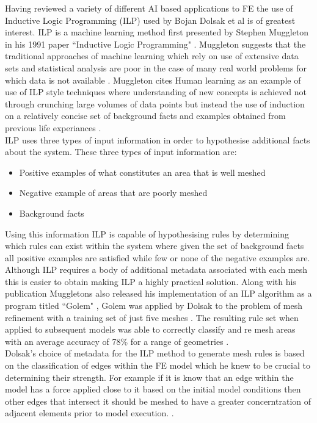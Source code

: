 \documentclass{article}
\begin{document}
\noindent
Having reviewed a variety of different AI based applications to FE the use of Inductive Logic Programming (ILP) used by Bojan Dolsak et al is of greatest interest. ILP is a machine learning method first presented by Stephen Muggleton in his 1991 paper ``Inductive Logic Programming" \cite{MuggletonILP}. Muggleton suggests that the traditional approaches of machine learning which rely on use of extensive data sets and statistical analysis are poor in the case of many real world problems for which data is not available \cite{ILPYoutubeLecture}. Muggleton cites Human learning as an example of use of ILP style techniques where understanding of new concepts is achieved not through crunching large volumes of data points but instead  the use of induction on a relatively concise set of background facts and examples obtained from previous life experiances \cite{ILPYoutubeLecture}. \\ 

\noindent
ILP uses three types of input information in order to hypothesise additional facts about the system. These three types of input information are: \\ 

\begin{itemize}
\item Positive examples  of what constitutes an area that is well meshed
\item Negative example of areas that are poorly meshed
\item Background facts
\end{itemize}

\noindent
Using this information ILP is capable of hypothesising rules by determining which rules can exist within the system where given the set of background facts all positive examples are satisfied while few or none of the negative examples are. Although ILP requires a body of additional metadata associated with each mesh this is easier to obtain making ILP a highly practical solution. Along with his publication Muggletons also released his implementation of an ILP algorithm as a program titled ``Golem" \cite{Golem}, Golem was applied by Dolsak to the problem of mesh refinement with a training set of just five meshes \cite{DolsakPaper94}. The resulting rule set when applied to subsequent models was able to correctly classify and re mesh areas with an average accuracy of 78\% for a range of geometries \cite{DolsakPaper94} \cite{appOfILPToFEMeshDesign}. \\

\noindent
Dolsak's choice of metadata for the ILP method to generate mesh rules is based on the classification of edges within the FE model which he knew to be crucial to determining their strength. For example if it is know that an edge within the model has a force applied close to it based on the initial model conditions then other edges that intersect it should be meshed to have a greater concerntration of adjacent elements prior to model execution. \cite{DolsakPaper91} \cite{appOfILPToFEMeshDesign}.\\ 
\end{document}
